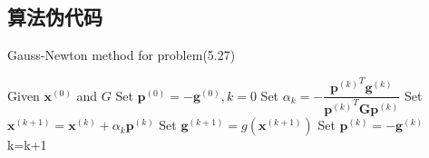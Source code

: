 \subsection{算法伪代码}
\begin{algorithm}[h]  
\caption{Gauss-Newton method for problem(5.27)}  
\begin{algorithmic}[1]  
\STATE Given $\bm{x}^{(0)}$ and $G$
\STATE Set $\bm{p}^{(0)}=-\bm{g}^{(0)},k=0$
\STATE Set $\alpha_k=-\dfrac{{{\bm{p}^{(k)}}^T}\bm{g}^{(k)}}{{\bm{p}^{(k)}}^T\bm{G}\bm{p}^{(k)}}$
\STATE Set $\bm{x}^{(k+1)}=\bm{x}^{(k)}+\alpha_k\bm{p}^{(k)}$
\STATE Set $\bm{g}^{(k+1)}=g(\bm{x}^{(k+1)})$
\STATE Set $\bm{p}^{(k)}=-\bm{g}^{(k)}$
\STATE k=k+1
\ENDWHILE
\end{algorithmic}  
\end{algorithm}  

